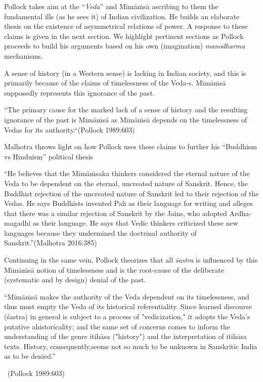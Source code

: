 Pollock takes aim at the “\textit{Veda}” and Mīmāṁsā ascribing to them the fundamental ills (as he sees it) of Indian civilization. He builds an elaborate thesis on the existence of asymmetrical relations of power. A response to these claims is given in the next section. We highlight pertinent sections as Pollock proceeds to build his arguments based on his own (imagination) \textit{manodharma} mechanisms.

A sense of history (in a Western sense) is lacking in Indian society, and this is primarily because of the claims of timelessness of the Veda-s. Mīmāṁsā supposedly represents this ignorance of the past.

\begin{myquote}
“The primary cause for the marked lack of a sense of history and the resulting ignorance of the past is Mīmāṁsā as Mīmāṁsā depends on the timelessness of Vedas for its authority.“\hfill (Pollock 1989:603)
\end{myquote}

Malhotra throws light on how Pollock uses these claims to further his “Buddhism vs Hinduism” political thesis

\begin{myquote}
“He believes that the Mīmāṁsaka thinkers considered the eternal nature of the Veda to be dependent on the eternal, uncreated nature of Sanskrit. Hence, the Buddhist rejection of the uncreated nature of Sanskrit led to their rejection of the Vedas. He says Buddhists invented Pali as their language for writing and alleges that there was a similar rejection of Sanskrit by the Jains, who adopted Ardha-magadhi as their language. He says that Vedic thinkers criticized these new languages because they undermined the doctrinal authority of Sanskrit.”\hfill (Malhotra 2016:385)
\end{myquote}

Continuing in the same vein, Pollock theorizes that all \textit{śastra} is influenced by this Mīmāṁsā notion of timelessness and is the root-cause of the deliberate (systematic and by design) denial of the past.

\begin{myquote}
“Mīmāṁsā makes the authority of the Veda dependent on its timelessness, and thus must empty the Veda of its historical referentiality. Since learned discourse (śastra) in general is subject to a process of "vedicization," it adopts the Veda's putative ahistoricality; and the same set of concerns comes to inform the understanding of the genre itihāsa ("history") and the interpretation of itihāsa texts. History, consequently,\break seems not so much to be unknown in Sanskritic India as to be denied.”

~\hfill (Pollock 1989:603)
\end{myquote}

